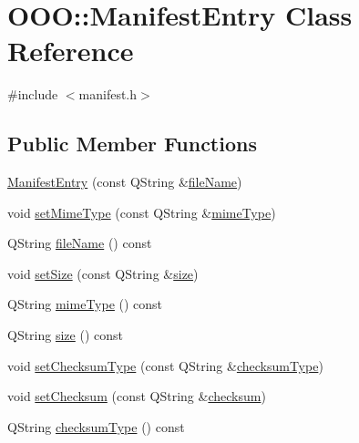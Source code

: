 \hypertarget{classOOO_1_1ManifestEntry}{\section{O\+O\+O\+:\+:Manifest\+Entry Class Reference}
\label{classOOO_1_1ManifestEntry}
}


{\ttfamily \#include $<$manifest.\+h$>$}

\subsection*{Public Member Functions}
\begin{DoxyCompactItemize}
\item 
\hyperlink{classOOO_1_1ManifestEntry_a7e44712a89481d7e6bc9519a95230597}{Manifest\+Entry} (const Q\+String \&\hyperlink{classOOO_1_1ManifestEntry_ae1238ad127da660fdef017046a94b5aa}{file\+Name})
\item 
void \hyperlink{classOOO_1_1ManifestEntry_ab100ed14298e33bb907752ad8e8d17f1}{set\+Mime\+Type} (const Q\+String \&\hyperlink{classOOO_1_1ManifestEntry_af31da7ffc13137810f8d5611a77e69c9}{mime\+Type})
\item 
Q\+String \hyperlink{classOOO_1_1ManifestEntry_ae1238ad127da660fdef017046a94b5aa}{file\+Name} () const 
\item 
void \hyperlink{classOOO_1_1ManifestEntry_ae73f2907cba2cfec09e9203299ca701a}{set\+Size} (const Q\+String \&\hyperlink{classOOO_1_1ManifestEntry_a81d532880b25c6db4a1f7586a468f138}{size})
\item 
Q\+String \hyperlink{classOOO_1_1ManifestEntry_af31da7ffc13137810f8d5611a77e69c9}{mime\+Type} () const 
\item 
Q\+String \hyperlink{classOOO_1_1ManifestEntry_a81d532880b25c6db4a1f7586a468f138}{size} () const 
\item 
void \hyperlink{classOOO_1_1ManifestEntry_a4e69eda5242a4f4a4741a8d627f6962c}{set\+Checksum\+Type} (const Q\+String \&\hyperlink{classOOO_1_1ManifestEntry_a4f38fd726261188239dddf22aad3094d}{checksum\+Type})
\item 
void \hyperlink{classOOO_1_1ManifestEntry_a48e5174537ba7916f143a9329a5b4218}{set\+Checksum} (const Q\+String \&\hyperlink{classOOO_1_1ManifestEntry_a664851cf0939cdd4ffa5f1c79085d8e3}{checksum})
\item 
Q\+String \hyperlink{classOOO_1_1ManifestEntry_a4f38fd726261188239dddf22aad3094d}{checksum\+Type} () const 
\item 

\end{DoxyCompactItemize}
